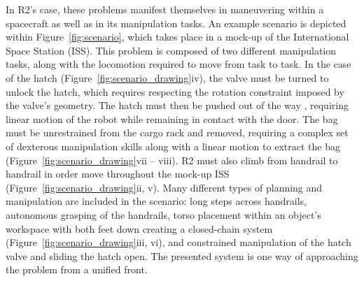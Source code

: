In R2's case, these problems manifest themselves in maneuvering within a spacecraft as well as in its manipulation tasks.
An example scenario is depicted within Figure~\ref{fig:scenario}, which takes place in a mock-up of the International Space Station (ISS).
This problem is composed of two different manipulation tasks, along with the locomotion required to move from task to task.
In the case of the hatch (Figure~\ref{fig:scenario_drawing}iv), the valve must be turned to unlock the hatch, which requires respecting the rotation constraint imposed by the valve's geometry.
The hatch must then be pushed out of the way , requiring linear motion of the robot while remaining in contact with the door.
The bag must be unrestrained from the cargo rack and removed, requiring a complex set of dexterous manipulation skills along with a linear motion to extract the bag (Figure~\ref{fig:scenario_drawing}vii -- viii).
R2 must also climb from handrail to handrail in order move throughout the mock-up ISS (Figure~\ref{fig:scenario_drawing}ii, v).
Many different types of planning and manipulation are included in the scenario: long steps across handrails, autonomous grasping of the handrails, torso placement within an object's workspace with both feet down creating a closed-chain system (Figure~\ref{fig:scenario_drawing}iii, vi), and constrained manipulation of the hatch valve and sliding the hatch open.
The presented system is one way of approaching the problem from a unified front. 
